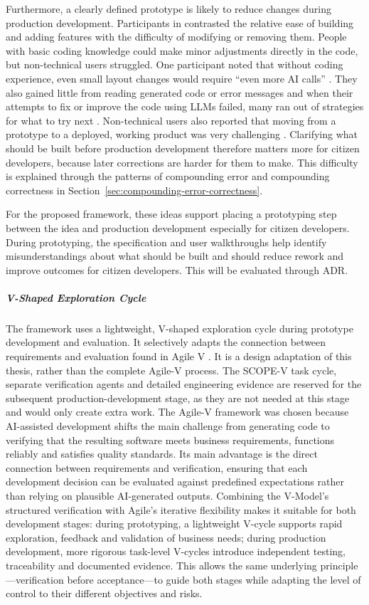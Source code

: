 \documentclass[10pt,a4paper]{article}
\begin{document}
Furthermore, a clearly defined prototype is likely to reduce changes during production development. Participants in \textcite{kobiella2026} contrasted the relative ease of building and adding features with the difficulty of modifying or removing them. People with basic coding knowledge could make minor adjustments directly in the code, but non-technical users struggled. One participant noted that without coding experience, even small layout changes would require “even more AI calls” \parencite{kobiella2026}. They also gained little from reading generated code or error messages and when their attempts to fix or improve the code using LLMs failed, many ran out of strategies for what to try next \parencite{feldman2024}. Non-technical users also reported that moving from a prototype to a deployed, working product was very challenging \parencite{kobiella2026}. Clarifying what should be built before production development therefore matters more for citizen developers, because later corrections are harder for them to make.
This difficulty is explained through the patterns of compounding error and compounding correctness in Section~\ref{sec:compounding-error-correctness}.

For the proposed framework, these ideas support placing a prototyping step between the idea and production development especially for citizen developers. During prototyping, the specification and user walkthroughs help identify misunderstandings about what should be built and should reduce rework and improve outcomes for citizen developers. This will be evaluated through ADR.

\subparagraph{V-Shaped Exploration Cycle}

The framework uses a lightweight, V-shaped exploration cycle during prototype development and evaluation. It selectively adapts the connection between requirements and evaluation found in Agile V \parencite{koch2026agile}. It is a design adaptation of this thesis, rather than the complete Agile-V process. The SCOPE-V task cycle, separate verification agents and detailed engineering evidence are reserved for the subsequent production-development stage, as they are not needed at this stage and would only create extra work. The Agile-V framework was chosen because AI-assisted development shifts the main challenge from generating code to verifying that the resulting software meets business requirements, functions reliably and satisfies quality standards. Its main advantage is the direct connection between requirements and verification, ensuring that each development decision can be evaluated against predefined expectations rather than relying on plausible AI-generated outputs. Combining the V-Model's structured verification with Agile's iterative flexibility makes it suitable for both development stages: during prototyping, a lightweight V-cycle supports rapid exploration, feedback and validation of business needs; during production development, more rigorous task-level V-cycles introduce independent testing, traceability and documented evidence. This allows the same underlying principle—verification before acceptance—to guide both stages while adapting the level of control to their different objectives and risks.
\end{document}

